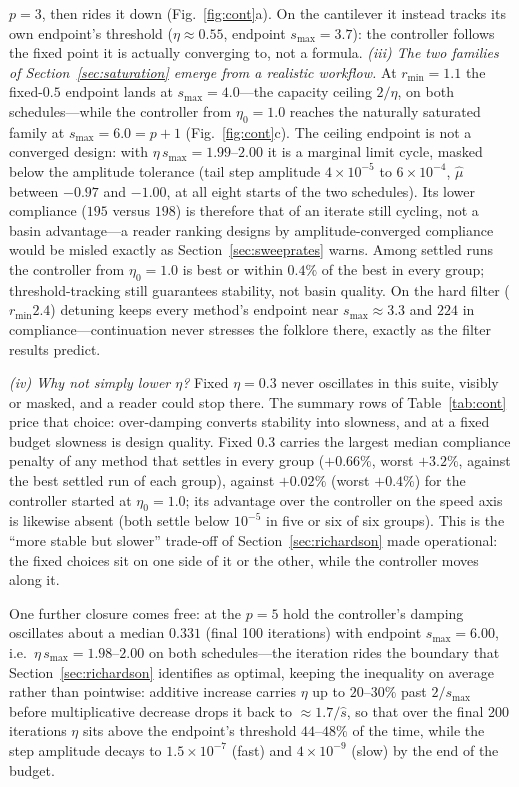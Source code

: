 \documentclass[11pt,a4paper]{article}
\newcommand{\smax}{s_{\max}}
\newcommand{\muh}{\hat{\mu}}
\newcommand{\sh}{\hat{s}}
\begin{document}
$p=3$, then rides it down (Fig.~\ref{fig:cont}a). On the cantilever it
instead tracks its own endpoint's threshold ($\eta\approx0.55$, endpoint
$\smax=3.7$): the controller follows the fixed point it is actually
converging to, not a formula. \emph{(iii) The two families of
Section~\ref{sec:saturation} emerge from a realistic workflow.} At
$r_{\min}=1.1$ the fixed-$0.5$ endpoint lands at $\smax=4.0$---the
capacity ceiling $2/\eta$, on both schedules---while the controller from
$\eta_0=1.0$ reaches the naturally saturated family at $\smax=6.0=p{+}1$
(Fig.~\ref{fig:cont}c). The ceiling endpoint is not a converged design:
with $\eta\,\smax=1.99$--$2.00$ it is a marginal limit cycle, masked below the
amplitude tolerance (tail step amplitude $4\times10^{-5}$ to
$6\times10^{-4}$, $\muh$ between $-0.97$ and $-1.00$, at all eight
starts of the two schedules). Its lower compliance ($195$ versus $198$)
is therefore that of an iterate still cycling, not a basin advantage---a
reader ranking designs by amplitude-converged compliance would be
misled exactly as Section~\ref{sec:sweeprates} warns. Among settled runs
the controller from $\eta_0=1.0$ is best or within $0.4\%$ of the best
in every group; threshold-tracking still guarantees stability, not
basin quality. On the hard filter
($r_{\min}2.4$) detuning keeps every method's endpoint near
$\smax\approx3.3$ and $224$ in compliance---continuation never stresses
the folklore there, exactly as the filter results predict.

\emph{(iv) Why not simply lower $\eta$?} Fixed $\eta=0.3$ never
oscillates in this suite, visibly or masked, and a reader could stop
there. The summary
rows of Table~\ref{tab:cont} price that choice: over-damping converts
stability into slowness, and at a fixed budget slowness is design
quality. Fixed $0.3$ carries the largest median compliance penalty of
any method that settles in every group ($+0.66\%$, worst $+3.2\%$,
against the best settled run of each group), against $+0.02\%$ (worst
$+0.4\%$) for the controller started at $\eta_0=1.0$;
its advantage over the controller on the speed axis is likewise absent
(both settle below $10^{-5}$ in five or six of six groups). This is the
``more stable but slower'' trade-off of Section~\ref{sec:richardson}
made operational: the fixed choices sit on one side of it or the other,
while the controller moves along it.

One further closure comes free: at the $p=5$ hold the controller's
damping oscillates about a median $0.331$ (final 100 iterations) with
endpoint $\smax=6.00$, i.e.\ $\eta\,\smax=1.98$--$2.00$ on both
schedules---the iteration rides the boundary that
Section~\ref{sec:richardson} identifies as optimal, keeping the
inequality on average rather than pointwise: additive increase carries
$\eta$ up to $20$--$30\%$ past $2/\smax$ before multiplicative decrease
drops it back to $\approx1.7/\sh$, so that over the final 200
iterations $\eta$ sits above the endpoint's threshold $44$--$48\%$ of
the time, while the step amplitude decays to $1.5\times10^{-7}$ (fast)
and $4\times10^{-9}$ (slow) by the end of the budget.
\end{document}
